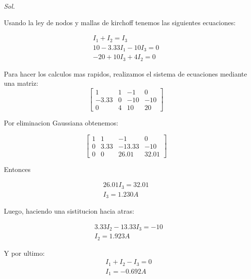 \begin{enumerate}
	      \textit{Sol. }


	      Usando la ley de nodos y mallas de kirchoff tenemos las siguientes ecuaciones:

	      \begin{align*}
		      I_1+I_2=I_3 \\10-3.33I_1-10I_3=0\\-20+10I_3+4I_2=0
	      \end{align*}

	      Para hacer los calculos mas rapidos, realizamos el sistema de ecuaciones mediante una matriz:
	      \begin{equation*}
		      \left [
			      \begin{array}{cccc}
				      1     & 1 & -1  & 0   \\
				      -3.33 & 0 & -10 & -10 \\
				      0     & 4 & 10  & 20
			      \end{array}
			      \right]
	      \end{equation*}

	      Por eliminacion Gaussiana obtenemos:

	      \begin{equation*}
		      \left [
			      \begin{array}{cccc}
				      1 & 1    & -1     & 0     \\
				      0 & 3.33 & -13.33 & -10   \\
				      0 & 0    & 26.01  & 32.01
			      \end{array}
			      \right]
	      \end{equation*}

	      Entonces

	      \begin{align*}
		      26.01I_3=32.01 \\I_3=1.2 30A
	      \end{align*}

	      Luego, haciendo una sistitucion hacia atras:


	      \begin{align*}
		       & 3.33I_2-13.33I_3=-10 \\
		       & I_2=1.923 A
	      \end{align*}

	      Y por ultimo:
	      \begin{align*}
		       & I_1+I_2-I_3=0 \\
		       & I_1= -0.692 A
	      \end{align*}


\end{enumerate}
